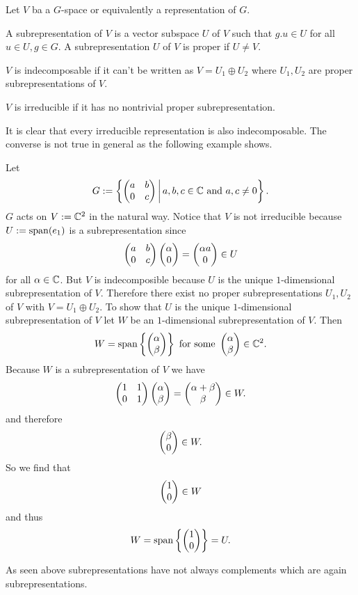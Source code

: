 \begin{defi}
  Let $V$ ba a $G$-space or equivalently a representation of $G$.

  A subrepresentation of $V$ is a vector subspace $U$ of $V$ such that $g.u \in U$ for all $u \in U, g \in G$. A subrepresentation $U$ of $V$ is proper if $U \neq V$.
  
  $V$ is indecomposable if it can’t be written as $V = U_1 \oplus U_2$ where $U_1, U_2$ are proper subrepresentations of $V$.
  
  $V$ is irreducible if it has no nontrivial proper subrepresentation.
\end{defi}

It is clear that every irreducible representation is also indecomposable. The converse is not true in general as the following example shows.

\begin{expl}
 Let
 \[
  G := \left\{ \begin{pmatrix}a&b\\0&c\end{pmatrix} \,\middle|\, a,b,c \in \mathbb{C} \text{ and } a, c \neq 0 \right\}.
 \]
 $G$ acts on $V := \mathbb{C}^2$ in the natural way. Notice that $V$ is not irreducible because $U := \operatorname{span}(e_1)$ is a subrepresentation since
 \[
  \begin{pmatrix}a&b\\0&c\end{pmatrix} \begin{pmatrix}\alpha\\0\end{pmatrix} = \begin{pmatrix}\alpha a\\0\end{pmatrix} \in U
 \]
 for all $\alpha \in \mathbb{C}$. But $V$ is indecomposible because $U$ is the unique $1$-dimensional subrepresentation of $V$.  Therefore there exist no proper subrepresentations $U_1, U_2$ of $V$ with $V = U_1 \oplus U_2$. To show that $U$ is the unique $1$-dimensional subrepresentation of $V$ let $W$ be an $1$-dimensional subrepresentation of $V$. Then
 \[
  W = \operatorname{span}\left\{ \begin{pmatrix}\alpha\\\beta\end{pmatrix} \right\} \text{ for some } \begin{pmatrix}\alpha\\\beta\end{pmatrix} \in \mathbb{C}^2.
 \]
 Because $W$ is a subrepresentation of $V$ we have
 \[
  \begin{pmatrix}1&1\\0&1\end{pmatrix} \begin{pmatrix}\alpha\\\beta\end{pmatrix} = \begin{pmatrix}\alpha+\beta\\\beta\end{pmatrix} \in W.
 \]
 and therefore
 \[
  \begin{pmatrix}\beta\\0\end{pmatrix} \in W.
 \]
 So we find that
 \[
  \begin{pmatrix}1\\0\end{pmatrix} \in W
 \]
 and thus
 \[
  W = \operatorname{span}\left\{\begin{pmatrix}1\\0\end{pmatrix}\right\} = U.
 \]
\end{expl}


\begin{warn}
 As seen above subrepresentations have not always complements which are again subrepresentations.
\end{warn}


